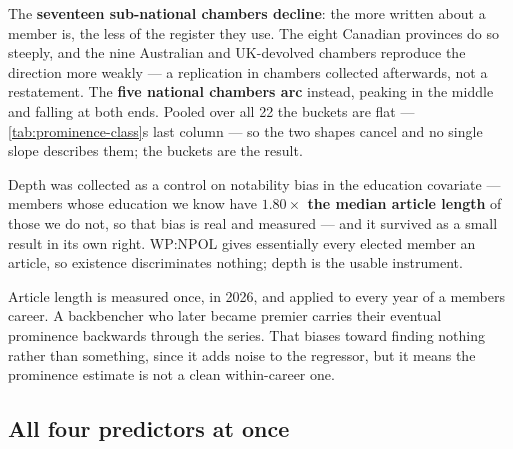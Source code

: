 The \textbf{seventeen sub-national chambers decline}: the more written about a
member is, the less of the register they use. The eight Canadian provinces do
so steeply, and the nine Australian and UK-devolved chambers reproduce the
direction more weakly --- a replication in chambers collected afterwards, not a
restatement. The \textbf{five national chambers arc} instead, peaking in the middle
and falling at both ends. Pooled over all 22 the buckets are flat --- \cref{tab:prominence-class}\textquotesingle s last column --- so the two shapes cancel and no single slope describes
them; the buckets are the result.

Depth was collected as a control on notability bias in the education covariate
--- members whose education we know have \textbf{\(1.80\times\) the median article length} of
those we do not, so that bias is real and measured --- and it survived as a small
result in its own right. WP:NPOL gives essentially every elected member an
article, so existence discriminates nothing; depth is the usable instrument.

Article length is measured once, in 2026, and applied to every year of a
member\textquotesingle s career. A backbencher who later became premier carries their eventual
prominence backwards through the series. That biases toward finding nothing
rather than something, since it adds noise to the regressor, but it means the
prominence estimate is not a clean within-career one.

\subsection{All four predictors at once}\label{sec:four-predictors}

